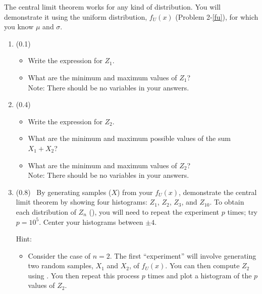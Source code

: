 \documentclass[11pt,titlepage,fleqn]{article}
\begin{document}
\begin{enumerate}
The central limit theorem works for any kind of distribution. You will demonstrate it using the uniform distribution, $f_U(x)$ (Problem 2-\ref{fu}), for which you know $\mu$ and $\sigma$.

\begin{enumerate}

\item (0.1)
\begin{itemize}
\item Write the expression for $Z_1$.
\item What are the minimum and maximum values of $Z_1$? \\
Note: There should be no variables in your answers.
\end{itemize}

\item (0.4)
\begin{itemize}
\item Write the expression for $Z_2$.
\item What are the minimum and maximum possible values of the sum $X_1 + X_2$?
\item What are the minimum and maximum values of $Z_2$? \\
Note: There should be no variables in your answers.
\end{itemize}

\item (0.8) \ptag\ By generating samples ($X$) from your $f_U(x)$, demonstrate the central limit theorem by showing four histograms: $Z_1$, $Z_2$, $Z_3$, and $Z_{10}$. To obtain each distribution of $Z_n$ (), you will need to repeat the experiment $p$ times; try $p = 10^5$. Center your histograms between $\pm 4$.

Hint:
\begin{itemize}
\item Consider the case of $n=2$. The first ``experiment'' will involve generating two random samples, $X_1$ and $X_2$, of $f_U(x)$. You can then compute $Z_2$ using . You then repeat this process $p$ times and plot a histogram of the $p$ values of $Z_2$.
\end{itemize}

\end{enumerate}

\end{enumerate}

\end{document}

